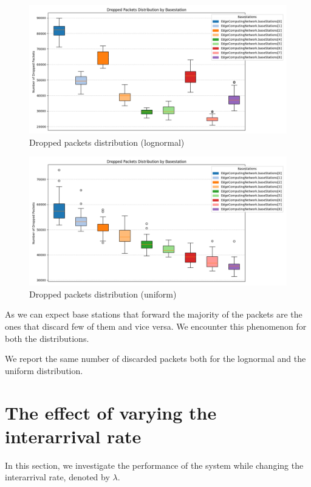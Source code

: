 \documentclass{report}
\begin{document}
\begin{figure}[H]
    \centering
    \includegraphics[width=\textwidth]{img/plots/log_1e4_B/dropped.png}
    \caption{Dropped packets distribution (lognormal)}
\end{figure}

\begin{figure}[H]
    \centering
    \includegraphics[width=\textwidth]{img/plots/uni_1e4_B/dropped.png}
    \caption{Dropped packets distribution (uniform)}
\end{figure}

\begin{flushleft}
As we can expect base stations that forward the majority of the packets are the ones that discard few of them and vice versa. We encounter this phenomenon for both the distributions.
\vspace{1em}

We report the same number of discarded packets both for the lognormal and the uniform distribution.
\end{flushleft}

\section{The effect of varying the interarrival rate}
In this section, we investigate the performance of the system while changing the interarrival rate, denoted by $\lambda$. 
\end{document}
